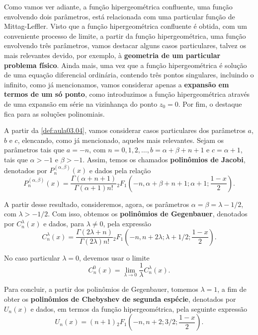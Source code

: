 Como vamos ver adiante, a função hipergeométrica confluente, uma função envolvendo dois parâmetros, está relacionada com uma particular função de Mittag-Leffler. Visto que a função hipergeométrica confluente é obtida, com um conveniente processo de limite, a partir da função hipergeométrica, uma função envolvendo três parâmetros, vamos destacar alguns casos particulares, talvez os mais relevantes devido, por exemplo, à \textbf{geometria de um particular problema físico}. Ainda mais, uma vez que a função hipergeométrica é solução de uma equação diferencial ordinária, contendo três pontos singulares, incluindo o infinito, como já mencionamos, vamos considerar apenas a \textbf{expansão em termos de um só ponto}, como introduzimos a função hipergeométrica através de uma expansão em série na vizinhança do ponto $z_0 = 0$. Por fim, o destaque fica para as soluções polinomiais.

A partir da \ref{def:aula03.04}, vamos considerar casos particulares dos parâmetros $a$, $b$ e $c$, elencando, como já mencionado, aqueles mais relevantes. Sejam os parâmetros tais que $a = -n$, com $n = 0, 1, 2, \ldots, b = \alpha +\beta+n+1$ e $c = \alpha +1$, tais que $\alpha > -1$ e $\beta > -1$. Assim, temos os chamados \textbf{polinômios de Jacobi}, denotados por $P_{n}^{(\alpha ,\beta)}(x)$ e dados pela relação
$$P_{n}^{(\alpha ,\beta)}(x) = \dfrac{\Gamma(\alpha + n + 1)}{\Gamma(\alpha + 1) n!}{}_2F_1\left(-n, \alpha + \beta + n + 1; \alpha + 1;\dfrac{1 - x}{2}\right).$$

A partir desse resultado, consideremos, agora, os parâmetros $\alpha = \beta = \lambda -1/2$, com $\lambda > -1/2$. Com isso, obtemos os \textbf{polinômios de Gegenbauer}, denotados por $C^\lambda_n(x)$ e dados, para $\lambda \neq 0$, pela expressão
$$C^\lambda_n(x) = \dfrac{\Gamma(2\lambda + n)}{\Gamma(2\lambda ) n!} {}_2F_1\left(-n, n + 2\lambda ; \lambda + 1/2;\dfrac{1 - x}{2}\right).$$

No caso particular $\lambda = 0$, devemos usar o limite
\begin{equation}\label{eq:aula03.04}
C^0_n(x) = \lim_{\lambda \rightarrow 0} \dfrac{1}{\lambda} C^\lambda_n(x).
\end{equation}

Para concluir, a partir dos polinômios de Gegenbauer, tomemos $\lambda = 1$, a fim de obter os \textbf{polinômios de Chebyshev de segunda espécie}, denotados por $U_n(x)$ e dados, em termos da função hipergeométrica, pela seguinte expressão
$$U_n(x) = (n + 1) {}_2F_1\left(-n, n + 2; 3/2;\dfrac{1 - x}{2}\right).$$

